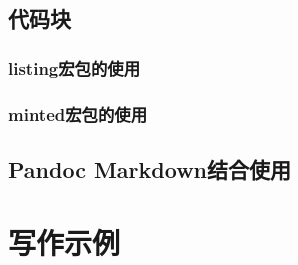 \documentclass[10pt, twocolumn, compact, crimson]{uglypaper}
\begin{document}
\subsection{代码块}


\subsubsection{listing宏包的使用}

\subsubsection{minted宏包的使用}


\subsection{Pandoc Markdown结合使用}



\section{写作示例}



\printbibliography[
  title=\ebibname]

\end{document}
